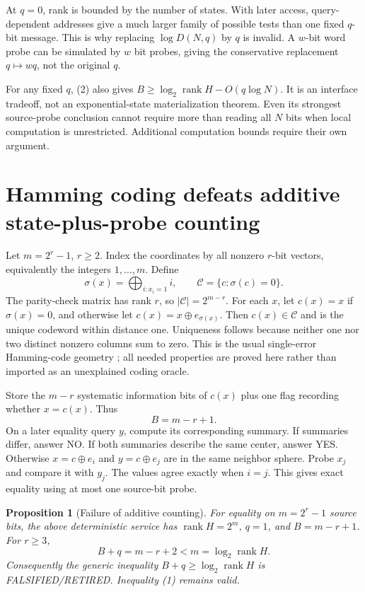 \documentclass[11pt]{article}
\newtheorem{proposition}[theorem]{Proposition}
\newcommand{\rank}{\operatorname{rank}}
\begin{document}
At $q=0$, rank is bounded by the number of states. With later access,
query-dependent addresses give a much larger family of possible tests than
one fixed $q$-bit message. This is why replacing $\log D(N,q)$ by $q$ is
invalid. A $w$-bit word probe can be simulated by $w$ bit probes, giving the
conservative replacement $q\mapsto wq$, not the original $q$.

For any fixed $q$, (2) also gives
$B\ge\log_2\rank H-O(q\log N)$. It is an interface tradeoff, not an
exponential-state materialization theorem. Even its strongest source-probe
conclusion cannot require more than reading all $N$ bits when local
computation is unrestricted. Additional computation bounds require their
own argument.

\section{Hamming coding defeats additive state-plus-probe counting}
Let $m=2^r-1$, $r\ge2$. Index the coordinates by all nonzero $r$-bit vectors,
equivalently the integers $1,\ldots,m$. Define
\[
 \sigma(x)=\bigoplus_{i:x_i=1}i,
 \qquad \mathcal C=\{c:\sigma(c)=0\}.
\]
The parity-check matrix has rank $r$, so $|\mathcal C|=2^{m-r}$.
For each $x$, let $c(x)=x$ if $\sigma(x)=0$, and otherwise let
$c(x)=x\oplus e_{\sigma(x)}$. Then $c(x)\in\mathcal C$ and is the unique
codeword within distance one. Uniqueness follows because neither one nor
two distinct nonzero columns sum to zero. This is the usual single-error
Hamming-code geometry \cite{hamming1950}; all needed properties are proved
here rather than imported as an unexplained coding oracle.

Store the $m-r$ systematic information bits of $c(x)$ plus one flag recording
whether $x=c(x)$. Thus
\[
 B=m-r+1.
\]
On a later equality query $y$, compute its corresponding summary.
If summaries differ, answer NO. If both summaries describe the same center,
answer YES. Otherwise $x=c\oplus e_i$ and $y=c\oplus e_j$ are in the same
neighbor sphere. Probe $x_j$ and compare it with $y_j$. The values agree
exactly when $i=j$. This gives exact equality using at most one source-bit
probe.

\begin{proposition}[Failure of additive counting]
For equality on $m=2^r-1$ source bits, the above deterministic service has
$\rank H=2^m$, $q=1$, and $B=m-r+1$. For $r\ge3$,
\[
 B+q=m-r+2<m=\log_2\rank H.
\]
Consequently the generic inequality $B+q\ge\log_2\rank H$ is
FALSIFIED/RETIRED. Inequality (1) remains valid.
\end{proposition}
\end{document}
